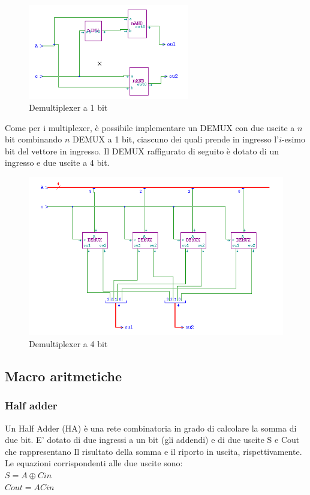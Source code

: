 \documentclass[10pt]{article}
\begin{document}
\begin{itemize}
    \begin{figure}[H]
    \begin{minipage}[b]{\textwidth}
    \centering
    \includegraphics[width=70mm]{demux1}
    \caption{Demultiplexer a 1 bit}
    \label{ }
    \end{minipage}
    \end{figure}

Come per i multiplexer, è possibile implementare un DEMUX con due uscite a $n$ bit combinando $n$ DEMUX a 1 bit, ciascuno dei quali prende in ingresso l'$i$-esimo bit del vettore in ingresso.
Il DEMUX raffigurato di seguito è dotato di un ingresso e due uscite a 4 bit.

\begin{figure}[H]
    \begin{minipage}[b]{\textwidth}
        \includegraphics[width=\textwidth]{demux4}
        \caption{Demultiplexer a 4 bit}
        \label{ }
    \end{minipage}
\end{figure}

\subsection{Macro aritmetiche}
\subsubsection{Half adder}
Un Half Adder (HA) è una rete combinatoria in grado di calcolare la somma di due bit. E' dotato di due ingressi a un bit (gli addendi) e di due uscite S e Cout che rappresentano Il
risultato della somma e il riporto in uscita, rispettivamente.
Le equazioni corrispondenti alle due uscite sono:\\
$S = A \oplus Cin$\\
$Cout = ACin$


\end{itemize}
\end{document}
